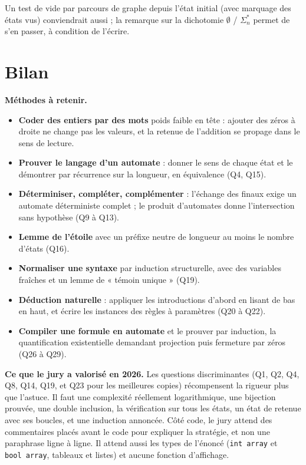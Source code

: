 \documentclass[11pt,a4paper]{article}
\providecommand{\tightlist}{\setlength{\itemsep}{0pt}\setlength{\parskip}{0pt}}
\begin{document}
\begin{methode}

Un test de vide par parcours de graphe depuis l'état initial (avec marquage des états vus) conviendrait aussi ; la remarque sur la dichotomie \(\emptyset\) / \(\Sigma_n^*\) permet de s'en passer, à condition de l'écrire.

\end{methode}

\hypertarget{bilan}{%
\section{Bilan}\label{bilan}}

\textbf{Méthodes à retenir.}

\begin{itemize}
\tightlist
\item
  \textbf{Coder des entiers par des mots} poids faible en tête : ajouter des zéros à droite ne change pas les valeurs, et la retenue de l'addition se propage dans le sens de lecture.
\item
  \textbf{Prouver le langage d'un automate} : donner le sens de chaque état et le démontrer par récurrence sur la longueur, en équivalence (Q4, Q15).
\item
  \textbf{Déterminiser, compléter, complémenter} : l'échange des finaux exige un automate déterministe complet ; le produit d'automates donne l'intersection sans hypothèse (Q9 à Q13).
\item
  \textbf{Lemme de l'étoile} avec un préfixe neutre de longueur au moins le nombre d'états (Q16).
\item
  \textbf{Normaliser une syntaxe} par induction structurelle, avec des variables fraîches et un lemme de « témoin unique » (Q19).
\item
  \textbf{Déduction naturelle} : appliquer les introductions d'abord en lisant de bas en haut, et écrire les instances des règles à paramètres (Q20 à Q22).
\item
  \textbf{Compiler une formule en automate} et le prouver par induction, la quantification existentielle demandant projection puis fermeture par zéros (Q26 à Q29).
\end{itemize}

\textbf{Ce que le jury a valorisé en 2026.} Les questions discriminantes (Q1, Q2, Q4, Q8, Q14, Q19, et Q23 pour les meilleures copies) récompensent la rigueur plus que l'astuce. Il faut une complexité réellement logarithmique, une bijection prouvée, une double inclusion, la vérification sur tous les états, un état de retenue avec ses boucles, et une induction annoncée. Côté code, le jury attend des commentaires placés avant le code pour expliquer la stratégie, et non une paraphrase ligne à ligne. Il attend aussi les types de l'énoncé (\texttt{int\ array} et \texttt{bool\ array}, tableaux et listes) et aucune fonction d'affichage.
\end{document}
